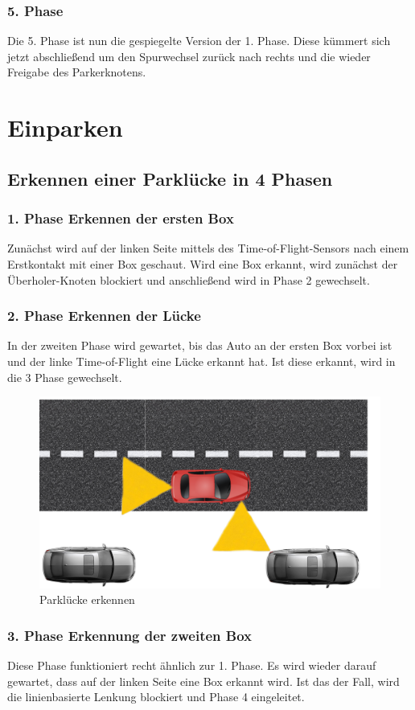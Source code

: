 \subsubsection{5. Phase}
Die 5. Phase ist nun die gespiegelte Version der 1. Phase. Diese kümmert sich jetzt abschließend um den Spurwechsel zurück nach rechts und die wieder Freigabe des Parkerknotens.



\section{Einparken}

\subsection{Erkennen einer Parklücke in 4 Phasen}

\subsubsection{1. Phase Erkennen der ersten Box}
Zunächst wird auf der linken Seite mittels des Time-of-Flight-Sensors nach einem Erstkontakt mit einer Box geschaut. Wird eine Box erkannt, wird zunächst der Überholer-Knoten blockiert und anschließend wird in Phase 2 gewechselt.

\subsubsection{2. Phase Erkennen der Lücke}
In der zweiten Phase wird gewartet, bis das Auto an der ersten Box vorbei ist und der linke Time-of-Flight eine Lücke erkannt hat. Ist diese erkannt, wird in die 3 Phase gewechselt.
\begin{figure}[H]
	\centering	
	\includegraphics[width=.5\textwidth]{img/Parken}
	\caption[Parklücke erkennen]{Parklücke erkennen}
	\label{fig:Parken}
\end{figure}

\subsubsection{3. Phase Erkennung der zweiten Box}
Diese Phase funktioniert recht ähnlich zur 1. Phase. Es wird wieder darauf gewartet, dass auf der linken Seite eine Box erkannt wird. Ist das der Fall, wird die linienbasierte Lenkung blockiert und Phase 4 eingeleitet.



